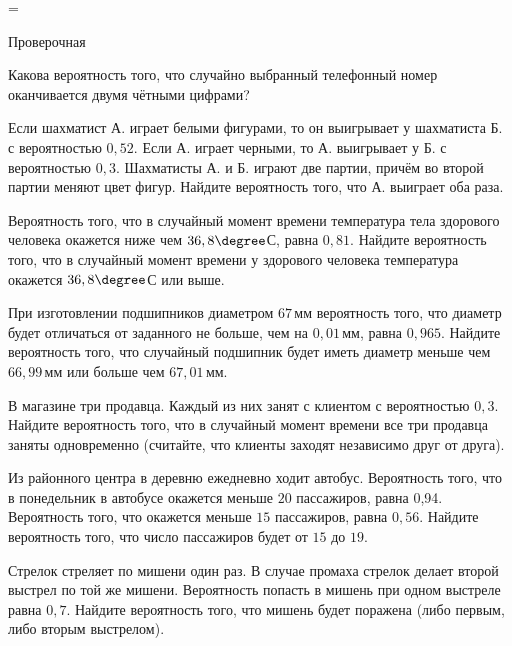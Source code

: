 =%
\begin{exam}
	\begin{listofex}
		\item Проверочная
	\end{listofex}
\end{exam}

\begin{consultation}
	\begin{listofex}
		\item Какова вероятность того, что случайно выбранный телефонный номер оканчивается двумя чётными цифрами?
		\item Если шахматист А. играет белыми фигурами, то он выигрывает у шахматиста Б. с вероятностью \( 0,52 \). Если А. играет черными, то А. выигрывает у Б. с вероятностью \( 0,3 \). Шахматисты А. и Б. играют две партии, причём во второй партии меняют цвет фигур. Найдите вероятность того, что А. выиграет оба раза.
		\item Вероятность того, что в случайный момент времени температура тела здорового человека окажется ниже чем \( 36,8\degree \)С, равна \( 0,81 \). Найдите вероятность того, что в случайный момент времени у здорового человека температура окажется \( 36,8\degree \)С или выше.
		\item При изготовлении подшипников диаметром \( 67 \) мм вероятность того, что диаметр будет отличаться от заданного не больше, чем на \( 0,01 \) мм, равна \( 0,965 \). Найдите вероятность того, что случайный подшипник будет иметь диаметр меньше чем \( 66,99 \) мм или больше чем \( 67,01 \) мм.
		\item В магазине три продавца. Каждый из них занят с клиентом с вероятностью \( 0,3 \). Найдите вероятность того, что в случайный момент времени все три продавца заняты одновременно (считайте, что клиенты заходят независимо друг от друга).
		\item Из районного центра в деревню ежедневно ходит автобус. Вероятность того, что в понедельник в автобусе окажется меньше \( 20 \) пассажиров, равна 0,94. Вероятность того, что окажется меньше \( 15 \) пассажиров, равна \( 0,56 \). Найдите вероятность того, что число пассажиров будет от \( 15 \) до \( 19 \).
		\item Стрелок стреляет по мишени один раз. В случае промаха стрелок делает второй выстрел по той же мишени. Вероятность попасть в мишень при одном выстреле равна \( 0,7 \). Найдите вероятность того, что мишень будет поражена (либо первым, либо вторым выстрелом).

\end{listofex}
\end{consultation}
